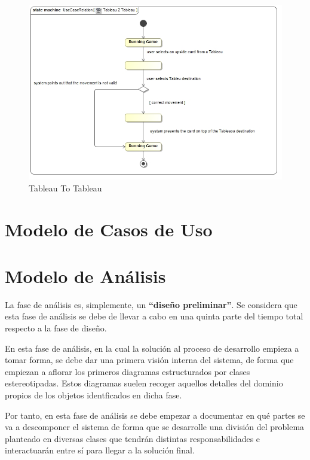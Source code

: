 \documentclass[11pt]{article}
\begin{document}
\begin{center}
 \begin{figure}[H]
 \begin{center}
   \includegraphics[width=14cm]{DomainModel/Tableau2Tableau.jpg}
   \caption{Tableau To Tableau}
   \label{fig:tableau2tableau}
 \end{center}
 \end{figure}
\end{center}

\pagebreak

\section{Modelo de Casos de Uso}

\pagebreak

\section{Modelo de Análisis}

La fase de análisis es, simplemente, un \textbf{``diseño preliminar''}. Se considera que esta fase de análisis se debe de llevar a cabo en una quinta parte del tiempo total respecto a la fase de diseño.

En esta fase de análisis, en la cual la solución al proceso de desarrollo empieza a tomar forma, se debe dar una primera visión interna del sistema, de forma que empiezan a aflorar los primeros diagramas estructurados por clases estereotipadas. Estos diagramas suelen recoger aquellos detalles del dominio propios de los objetos identficados en dicha fase.

Por tanto, en esta fase de análisis se debe empezar a documentar en qué partes se va a descomponer el sistema de forma que se desarrolle una división del problema planteado en diversas clases que tendrán distintas responsabilidades e interactuarán entre sí para llegar a la solución final. 
\end{document}
